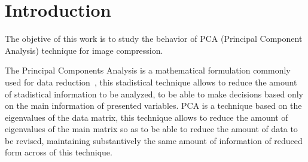 \documentclass[journal]{IEEEtran}
\begin{document}




\maketitle

\section{Introduction}
\label{sec:problem}
The objetive of this work is to study the behavior of PCA (Principal Component Analysis) technique for image compression.

The Principal Components Analysis is a mathematical formulation commonly used for data reduction~\cite{Jolliffe1986}, this stadistical technique allows to reduce the amount of stadistical information to be analyzed, to be able to make decisions based only on the main information of presented variables. PCA is a technique based on the eigenvalues of the data matrix, this technique allows to reduce the amount of eigenvalues of the main matrix so as to be able to reduce the amount of data to be revised, maintaining substantively the same amount of information of reduced form across of this technique.
\end{document}
